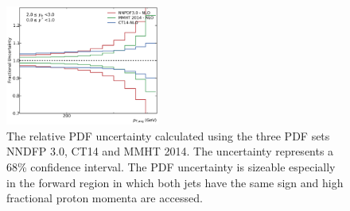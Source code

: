 \begin{figure}[htp]
    \includegraphics[width=0.45\textwidth]{figures/theory/pdf_unc_comparison_yb2ys0.pdf}
    \caption{The relative PDF uncertainty calculated using the three PDF sets
    NNDFP 3.0, CT14 and MMHT 2014. The uncertainty represents a 68\% confidence
    interval. The PDF uncertainty is sizeable especially in the forward region in
    which both jets have the same sign and high fractional proton momenta are
    accessed. }
    \label{fig:pdf_uncertainties}
\end{figure}

